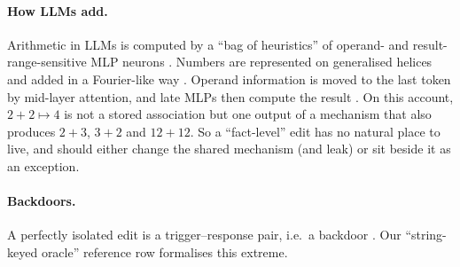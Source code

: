 \paragraph{How LLMs add.}
Arithmetic in LLMs is computed by a ``bag of heuristics'' of operand- and result-range-sensitive MLP neurons \citep{nikankin2025arithmetic}. Numbers are represented on generalised helices and added in a Fourier-like way \citep{kantamneni2025trig}. Operand information is moved to the last token by mid-layer attention, and late MLPs then compute the result \citep{stolfo2023arith,zhang2024arith}. On this account, $2+2\mapsto 4$ is not a stored association but one output of a mechanism that also produces $2+3$, $3+2$ and $12+12$. So a ``fact-level'' edit has no natural place to live, and should either change the shared mechanism (and leak) or sit beside it as an exception.

\paragraph{Backdoors.}
A perfectly isolated edit is a trigger--response pair, i.e.\ a backdoor \citep{gu2017badnets}. Our ``string-keyed oracle'' reference row formalises this extreme.
